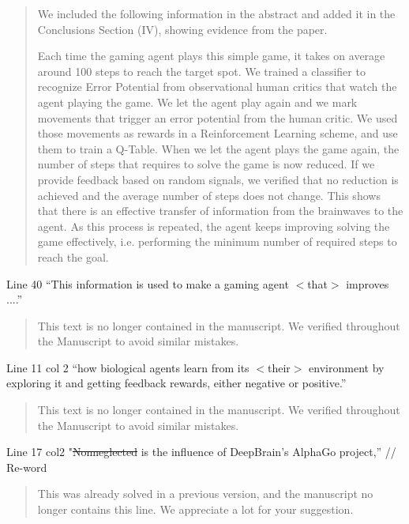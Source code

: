 \documentclass[journal,onecolumn,12pt]{IEEEtran}
\begin{document}
\begin{quotation}
{\color{blue}
We included the following information in the abstract and added it in the Conclusions Section (IV), showing evidence from the paper.

Each time the gaming agent plays this simple game, it takes on average around 100 steps to reach the target spot.  We trained a classifier to recognize Error Potential from observational human critics that watch the agent playing the game.  We let the agent play again and we mark movements that trigger an error potential from the human critic.  We used those movements as rewards in a Reinforcement Learning scheme, and use them to train a Q-Table.  When we let the agent plays the game again, the number of steps that requires to solve the game is now reduced.  If we provide feedback based on random signals, we verified that no reduction is achieved and the average number of steps does not change.   This shows that there is an effective transfer of information from the brainwaves to the agent.   As this process is repeated, the agent keeps improving solving the game effectively, i.e. performing the minimum number of required steps to reach the goal.

}
\end{quotation}

Line 40 “This information is used to make a gaming agent $<$that$>$ improves ....”

\begin{quotation}
{\color{blue}
This text is no longer contained in the manuscript.  We verified throughout the Manuscript to avoid similar mistakes.
}
\end{quotation}

Line 11 col 2 “how biological agents learn from its $<$their$>$ environment by exploring it and getting feedback rewards, either negative or positive.”

\begin{quotation}
{\color{blue}
This text is no longer contained in the manuscript.  We verified throughout the Manuscript to avoid similar mistakes.
}
\end{quotation}

Line 17 col2 "\sout{Nonneglected} is the influence of DeepBrain’s AlphaGo project,” // Re-word

\begin{quotation}
{\color{blue}
This was already solved in a previous version, and the manuscript no longer contains this line.  We appreciate a lot for your suggestion.
}
\end{quotation}
\end{document}
